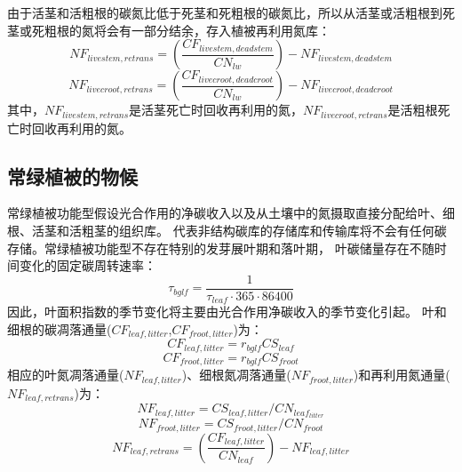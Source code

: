 由于活茎和活粗根的碳氮比低于死茎和死粗根的碳氮比，所以从活茎或活粗根到死茎或死粗根的氮将会有一部分结余，存入植被再利用氮库：
\begin{equation}
N F_{ {livestem,retrans }}=\left(\frac{CF_{ {livestem,deadstem }}}{CN_{lw}}\right)-N F_{ {livestem,deadstem }}
\end{equation}
\begin{equation}
N F_{ {livecroot,retrans }}=\left(\frac{CF_{ {livecroot,deadcroot }}}{CN_{lw}}\right)-N F_{ {livecroot,deadcroot }}
\end{equation}
其中，$NF_{livestem,retrans}$是活茎死亡时回收再利用的氮，$NF_{livecroot,retrans}$是活粗根死亡时回收再利用的氮。
\subsection{常绿植被的物候}\label{常绿植被的物候}
常绿植被功能型假设光合作用的净碳收入以及从土壤中的氮摄取直接分配给叶、细根、活茎和活粗茎的组织库。
代表非结构碳库的存储库和传输库将不会有任何碳存储。常绿植被功能型不存在特别的发芽展叶期和落叶期，
叶碳储量存在不随时间变化的固定碳周转速率：
\begin{equation}
\tau_{bglf}=\frac{1}{\tau_{leaf} \cdot 365 \cdot 86400}
\end{equation}
因此，叶面积指数的季节变化将主要由光合作用净碳收入的季节变化引起。
叶和细根的碳凋落通量($CF_{leaf,litter}$,$CF_{froot,litter}$)为：
\begin{equation}
CF_{leaf,litter}=r_{bglf} CS_{leaf}
\end{equation}
\begin{equation}
CF_{froot,litter}=r_{bglf} CS_{froot}
\end{equation}
相应的叶氮凋落通量($NF_{leaf,litter}$)、细根氮凋落通量($NF_{froot,litter}$)和再利用氮通量($NF_{leaf,retrans}$)为：
\begin{equation}
N F_{leaf,litter}=CS_{leaf,litter} / CN_{leaf_{litter}}
\end{equation}
\begin{equation}
N F_{froot,litter}=CS_{froot,litter} / CN_{froot}
\end{equation}
\begin{equation}
N F_{leaf,retrans}=\left(\frac{CF_{leaf,litter }}{CN_{leaf}}\right)-N F_{leaf,litter}
\end{equation}
